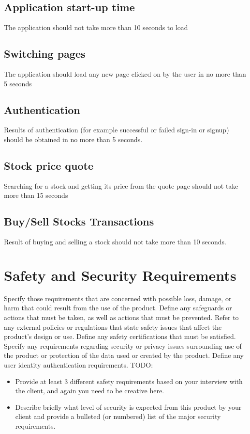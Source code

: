 \documentclass[12 pt, a4paper]{report}
\begin{document}
	\subsection{Application start-up time}
	The application should not take more than 10 seconds to load
	\subsection{Switching pages}
	The application should load any new page clicked on by the user in no more than 5 seconds
	\subsection{Authentication}
	Results of authentication (for example successful or failed sign-in or signup) should be obtained in no more than 5 seconds.
	\subsection{Stock price quote}
	Searching for a stock and getting its price from the quote page should not take more than 15 seconds
	\subsection{Buy/Sell Stocks Transactions}
	Result of buying and selling a stock should not take more than 10 seconds.
	
	

	
	\section {Safety and Security Requirements}
	Specify those requirements that are concerned with possible loss, damage, or harm that could result from the use of the product. Define any safeguards or actions that must be taken, as well as actions that must be prevented. Refer to any external policies or regulations that state safety issues that affect the product’s design or use. Define any safety certifications that must be satisfied. Specify any requirements regarding security or privacy issues surrounding use of the product or protection of the data used or created by the product. Define any user identity authentication requirements.
	TODO:
	\begin{itemize} 
		\item Provide at least 3 different safety requirements based on your interview with the client, and again you need to be creative here.
		\item Describe briefly what level of security is expected from this product by your client and provide a bulleted (or numbered) list of the major security requirements.
		\end {itemize}
		
\end{document}
